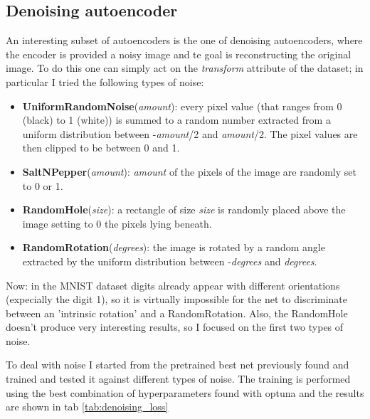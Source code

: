 \documentclass[a4paper, 11pt]{article}
\begin{document}
  \subsection{Denoising autoencoder}
    An interesting subset of autoencoders is the one of denoising autoencoders, where the encoder is provided a noisy image and te goal is reconstructing the original image. To do this one can simply act on the \emph{transform} attribute of the dataset; in particular I tried the following types of noise:

    \begin{itemize}
      \item \textbf{UniformRandomNoise}(\emph{amount}): every pixel value (that ranges from 0 (black) to 1 (white)) is summed to a random number extracted from a uniform distribution between -\emph{amount}/2 and \emph{amount}/2. The pixel values are then clipped to be between 0 and 1.
      \item \textbf{SaltNPepper}(\emph{amount}): \emph{amount} of the pixels of the image are randomly set to 0 or 1.
      \item \textbf{RandomHole}(\emph{size}): a rectangle of size \emph{size} is randomly placed above the image setting to 0 the pixels lying beneath.
      \item \textbf{RandomRotation}(\emph{degrees}): the image is rotated by a random angle extracted by the uniform distribution between -\emph{degrees} and \emph{degrees}.
    \end{itemize}

    Now: in the MNIST dataset digits already appear with different orientations (expecially the digit 1), so it is virtually impossible for the net to discriminate between an 'intrinsic rotation' and a RandomRotation. Also, the RandomHole doesn't produce very interesting results, so I focused on the first two types of noise.

    To deal with noise I started from the pretrained best net previously found and trained and tested it against different types of noise. The training is performed using the best combination of hyperparameters found with optuna and the results are shown in tab \ref{tab:denoising_loss}
\end{document}
